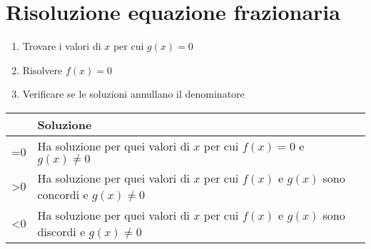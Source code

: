\section{Risoluzione equazione frazionaria}
\begin{enumerate}
	\item Trovare i valori di $x$ per cui $g(x)=0$
	\item Risolvere $f(x)=0$ 
	\item Verificare se le soluzioni annullano il denominatore 
\end{enumerate}
{\centering{}
	\begin{tabular}{Cp{0.4\textwidth}}
\toprule
	& Soluzione \\ 
\midrule
{}=0	& Ha soluzione per quei valori di $x$ per cui $f(x)=0$ e $g(x)\neq 0$  \\ 
>0	& Ha soluzione per quei valori di $x$ per cui $f(x)$ e $g(x)$ sono concordi e $g(x)\neq 0$  \\ 
<0	& Ha soluzione per quei valori di $x$ per cui $f(x)$ e $g(x)$ sono discordi e $g(x)\neq 0$  \\ 
\bottomrule
\end{tabular}\par}